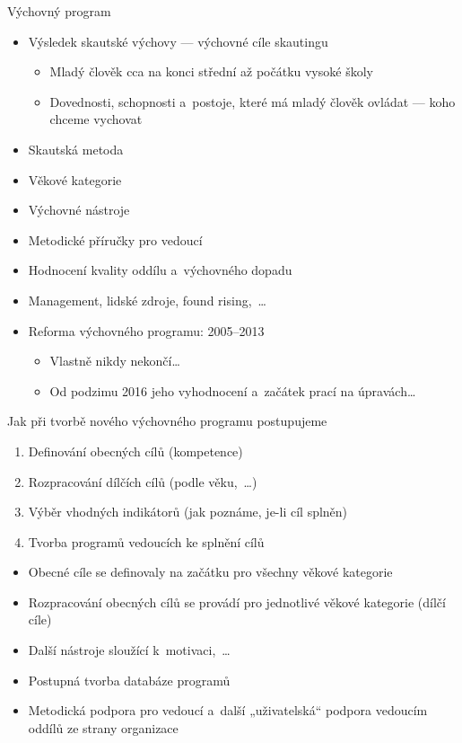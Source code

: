\documentclass[compress, ucs, xelatex, xcolor=dvipsnames, print,
  hyperref={
    bookmarks=true,
    unicode=true,
    colorlinks=true,
    plainpages=false,
    pdfkeywords={Skaut, Junak, Skauting, Vychovna metoda},
    linkcolor=Black,
    anchorcolor=Black,
    citecolor=OliveGreen,
    filecolor=OliveGreen,
    menucolor=Black,
    urlcolor=OliveGreen,
    pdftex}
  ]{beamer}
\begin{document}
\begin{frame}{Výchovný program}
  \begin{itemize}
    \item Výsledek skautské výchovy --- výchovné cíle skautingu
    \begin{itemize}
      \item Mladý člověk cca na konci střední až počátku vysoké školy
      \item Dovednosti, schopnosti a~postoje, které má mladý člověk ovládat --- koho chceme vychovat
    \end{itemize}
    \item Skautská metoda
    \item Věkové kategorie
    \item Výchovné nástroje
    \item Metodické příručky pro vedoucí
    \item Hodnocení kvality oddílu a~výchovného dopadu
    \item Management, lidské zdroje, found rising,~\ldots
    \item Reforma výchovného programu: 2005--2013
    \begin{itemize}
      \item Vlastně nikdy nekončí\ldots
      \item Od podzimu 2016 jeho vyhodnocení a~začátek prací na úpravách\ldots
    \end{itemize}
  \end{itemize}
\end{frame}

\begin{frame}{Jak při tvorbě nového výchovného programu postupujeme}
  \begin{enumerate}
    \item Definování obecných cílů (kompetence)
    \item Rozpracování dílčích cílů (podle věku,~\ldots)
    \item Výběr vhodných indikátorů (jak poznáme, je-li cíl splněn)
    \item Tvorba programů vedoucích ke splnění cílů
  \end{enumerate}
  \begin{itemize}
    \item Obecné cíle se definovaly na začátku pro všechny věkové kategorie
    \item Rozpracování obecných cílů se provádí pro jednotlivé věkové kategorie (dílčí cíle)
    \item Další nástroje sloužící k~motivaci,~\ldots
    \item Postupná tvorba databáze programů
    \item Metodická podpora pro vedoucí a~další „uživatelská“ podpora vedoucím oddílů ze strany organizace
  \end{itemize}
\end{frame}
\end{document}
